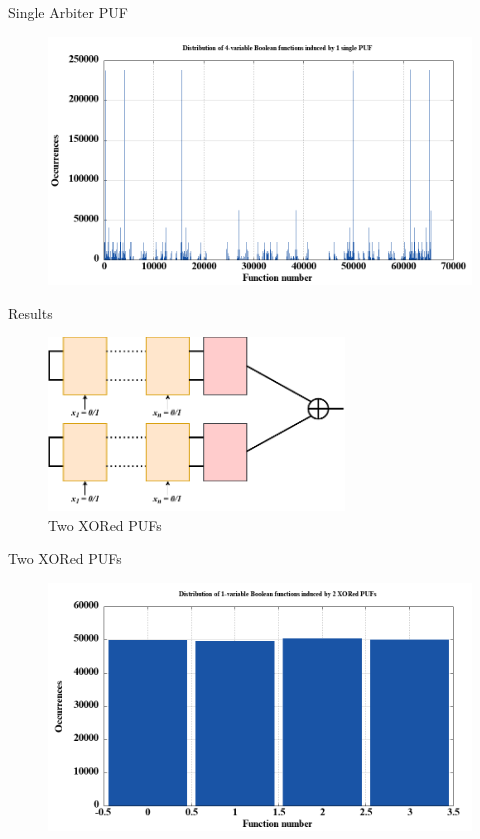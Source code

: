 \documentclass[10pt, compress]{beamer}
\begin{document}
\begin{frame}{Single Arbiter PUF}
    \begin{figure}
        \centering
        \includegraphics[width=\textwidth]{figures/dist/distribution_of_4-variable_boolean_functions_induced_by_1_single_puf.png}
    \end{figure}
\end{frame}


\begin{frame}{Results}
    \begin{figure}
        \centering
        \includegraphics[width=0.7\textwidth]{figures/puf_2_xor.pdf}
        \caption{Two XORed PUFs}
    \end{figure}
\end{frame}

\begin{frame}{Two XORed PUFs}
    \begin{figure}
        \centering
        \includegraphics[width=\textwidth]{figures/dist/distribution_of_1-variable_boolean_functions_induced_by_2_xored_pufs.png}
    \end{figure}
\end{frame}
\end{document}
